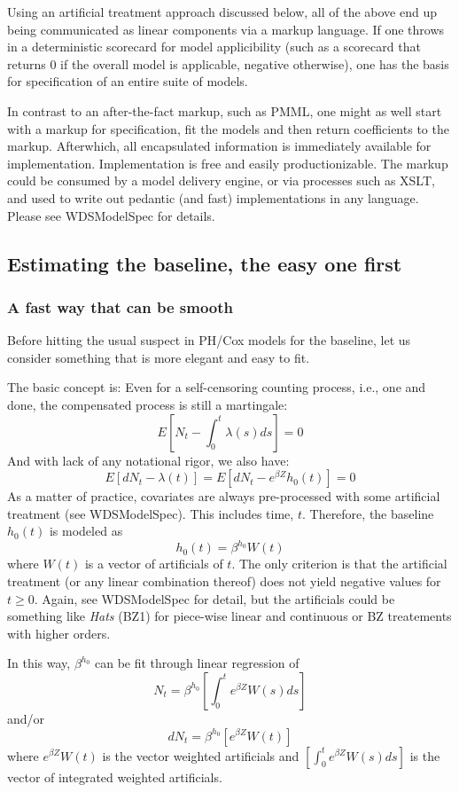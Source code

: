 \documentclass[10pt]{article}
\begin{document}
Using an artificial treatment approach discussed below, all of the above end up being communicated as linear components via a
markup language.  If one throws in a deterministic scorecard for model applicibility (such as a scorecard that returns 0 if the overall model is
applicable, negative otherwise), one has the basis for specification of an entire suite of models.  

In contrast to an after-the-fact markup, such as PMML, one might as well start with a markup for specification, fit the models and then return coefficients to the markup.  
Afterwhich, all encapsulated information is immediately available for implementation.  
Implementation is free and easily productionizable.  The markup could be consumed by a model delivery engine, or via processes such as  XSLT,
and used to write out pedantic (and fast) implementations in any language.  Please see WDSModelSpec for details.

\subsection{Estimating the baseline, the easy one first}

\subsubsection{A fast way that can be smooth}

Before hitting the usual suspect in PH/Cox models for the baseline, let us consider something that is more elegant and easy to fit.

The basic concept is: Even for a self-censoring counting process, i.e., one and done, the compensated process is  still a martingale:
$$E[ N_t - \int_0^t\lambda(s)ds ] = 0 $$
And with lack of any notational rigor, we also have:
$$E[ dN_t - \lambda(t) ] = E[ dN_t - e^{\beta Z} h_0(t) ] = 0 $$
As a matter of practice, covariates are always pre-processed with some artificial treatment (see WDSModelSpec).  
This includes time, $t$.  Therefore, the baseline $h_0(t)$ is modeled as 
$$ h_0(t) = \beta^{h_0}W(t) $$
where $W(t)$ is a vector of artificials of $t$. The only criterion is that the artificial treatment (or any linear combination thereof) does not yield negative values
for $t\ge 0$.
Again, see WDSModelSpec for detail, but the artificials could be something like {\em Hats} (BZ1) for piece-wise linear and continuous
or BZ treatements with higher orders.

In this way, $\beta^{h_0}$ can be fit through linear regression of 
    $$ N_t = \beta^{h_0} [\int_0^te^{\beta Z}W(s)ds ] $$
and/or
    $$ dN_t = \beta^{h_0}[e^{\beta Z}W(t)] $$
where $e^{\beta Z}W(t)$ is the vector weighted artificials and $[\int_0^te^{\beta Z}W(s)ds]$ is the vector of integrated weighted artificials. 
\end{document}
